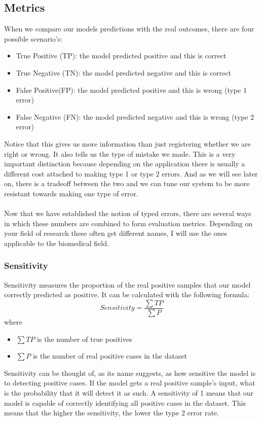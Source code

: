 \subsection{Metrics}
When we compare our models predictions with the real outcomes, there are four possible scenario's:
\begin{itemize}
	\item True Positive (TP): the model predicted positive and this is correct
	\item True Negative (TN): the model predicted negative and this is correct
	\item False Positive(FP): the model predicted positive and this is wrong (type 1 error)
	\item False Negative (FN): the model predicted negative and this is wrong (type 2 error)
\end{itemize}
Notice that this gives us more information than just registering whether we are right or wrong. It also tells us the type of mistake we made. This is a very important distinction because depending on the application there is usually a different cost attached to making type 1 or type 2 errors. And as we will see later on, there is a tradeoff between the two and we can tune our system to be more resistant towards making one type of error. \\ \\
Now that we have established the notion of typed errors, there are several ways in which these numbers are combined to form evaluation metrics. Depending on your field of research these often get different names, I will use the ones applicable to the biomedical field.
\subsubsection{Sensitivity}
Sensitivity measures the proportion of the real positive samples that our model correctly predicted as positive. It can be calculated with the following formula:
$$
Sensitivity = \frac{\sum{TP}}{\sum{P}}
$$
where
\begin{itemize}
	\item $\sum{TP}$ is the number of true positives
	\item $\sum{P}$ is the number of real positive cases in the dataset
\end{itemize}
Sensitivity can be thought of, as its name suggests, as how sensitive the model is to detecting positive cases. If the model gets a real positive sample's input, what is the probability that it will detect it as such. A sensitivity of 1 means that our model is capable of correctly identifying all positive cases in the dataset. This means that the higher the sensitivity, the lower the type 2 error rate.
